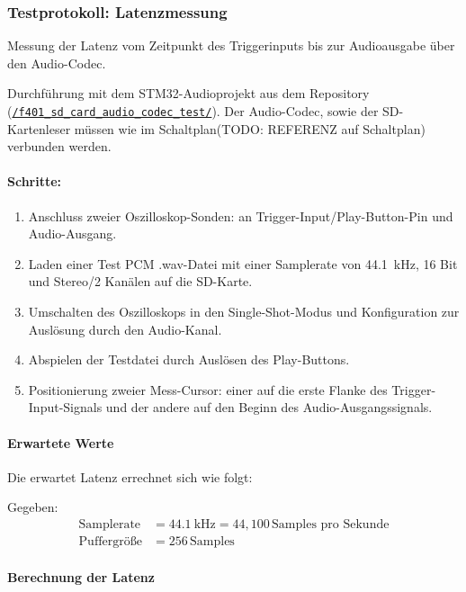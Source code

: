 \subsubsection{Testprotokoll: Latenzmessung}
\label{test-latenzmessung}

Messung der Latenz vom Zeitpunkt des Triggerinputs bis zur Audioausgabe über den Audio-Codec.

Durchführung mit dem STM32-Audioprojekt aus dem Repository (\href{run:../../f401_sd_card_audio_codec_test/}{\texttt{/f401\_sd\_card\_audio\_codec\_test/}}).
Der Audio-Codec, sowie der SD-Kartenleser müssen wie im Schaltplan(TODO: REFERENZ auf Schaltplan) verbunden werden.

\paragraph{Schritte:}
\begin{enumerate}
	\item Anschluss zweier Oszilloskop-Sonden: an Trigger-Input/Play-Button-Pin und Audio-Ausgang.
	\item Laden einer Test PCM .wav-Datei mit einer Samplerate von \SI{44.1}{\kilo\hertz}, 16 Bit und Stereo/2 Kanälen auf die SD-Karte.
	\item Umschalten des Oszilloskops in den Single-Shot-Modus und Konfiguration zur Auslösung durch den Audio-Kanal.
	\item Abspielen der Testdatei durch Auslösen des Play-Buttons.
	\item Positionierung zweier Mess-Cursor: einer auf die erste Flanke des Trigger-Input-Signals und der andere auf den Beginn des Audio-Ausgangssignals.
\end{enumerate}
\paragraph{Erwartete Werte}
	Die erwartet Latenz errechnet sich wie folgt:
	
	Gegeben:
	\begin{align*}
		\text{Samplerate} &= \SI{44.1}{\kilo\hertz} = 44{,}100 \, \text{Samples pro Sekunde} \\
		\text{Puffergröße} &= 256 \, \text{Samples}
	\end{align*}
	
	\paragraph*{Berechnung der Latenz}
	
